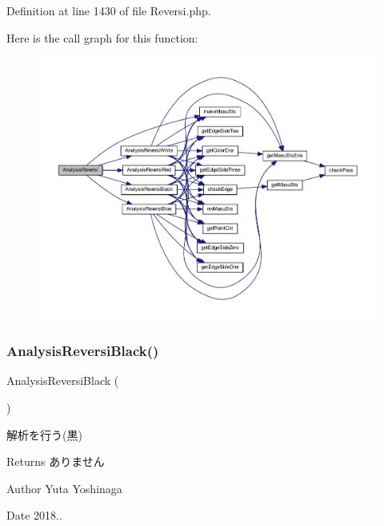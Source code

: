 Definition at line 1430 of file Reversi.\+php.

Here is the call graph for this function\+:
\nopagebreak
\begin{figure}[H]
\begin{center}
\leavevmode
\includegraphics[width=350pt]{class_reversi_a1e2f4c432c1e407c4dbec20f4ee1b3b7_cgraph}
\end{center}
\end{figure}
\mbox{\label{class_reversi_a471972ec549188f7eb701d57e14ae7a1}} 
\subsubsection{\texorpdfstring{Analysis\+Reversi\+Black()}{AnalysisReversiBlack()}}
{\footnotesize\ttfamily Analysis\+Reversi\+Black (\begin{DoxyParamCaption}{ }\end{DoxyParamCaption})\hspace{0.3cm}{\ttfamily [private]}}



解析を行う(黒) 

\begin{DoxyReturn}{Returns}
ありません 
\end{DoxyReturn}
\begin{DoxyAuthor}{Author}
Yuta Yoshinaga 
\end{DoxyAuthor}
\begin{DoxyDate}{Date}
2018.. 
\end{DoxyDate}


